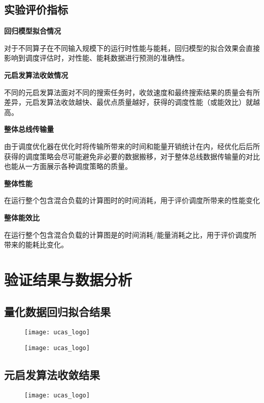     \subsection{实验评价指标}\label{sec:evaluation_metrics}
    \textbf{回归模型拟合情况}
    
    对于不同算子在不同输入规模下的运行时性能与能耗，回归模型的拟合效果会直接影响到调度评估时，对性能、能耗数据进行预测的准确性。
    
    \textbf{元启发算法收敛情况}

    不同的元启发算法面对不同的搜索任务时，收敛速度和最终搜索结果的质量会有所差异，元启发算法收敛越快、最优点质量越好，获得的调度性能（或能效比）就越高。
    
    \textbf{整体总线传输量}

    由于调度优化器在优化时将传输所带来的时间和能量开销统计在内，经优化后后所获得的调度策略会尽可能避免非必要的数据搬移，对于整体总线数据传输量的对比也能从一方面展示各种调度策略的质量。
    
    \textbf{整体性能}

    在运行整个包含混合负载的计算图时的时间消耗，用于评价调度所带来的性能变化

    
    \textbf{整体能效比}

    在运行整个包含混合负载的计算图是的时间消耗/能量消耗之比，用于评价调度所带来的能耗比变化。

\section{验证结果与数据分析}\label{sec:experiment_result}
    \subsection{量化数据回归拟合结果}\label{subsec:quantified_regression_training}
    \begin{figure}[!htbp]
        \centering
        \texttt{[image: ucas\_logo]}
        \bicaption{\quad }
        {\quad }
        \label{fig:xx}
    \end{figure}
    \begin{figure}[!htbp]
        \centering
        \texttt{[image: ucas\_logo]}
        \bicaption{\quad }
        {\quad }
        \label{fig:xx}
    \end{figure}
    \subsection{元启发算法收敛结果}\label{subsec:metaheuristic_convergence}
    \begin{figure}[!htbp]
        \centering
        \texttt{[image: ucas\_logo]}
        \bicaption{\quad }
        {\quad }
        \label{fig:xx}
    \end{figure}
